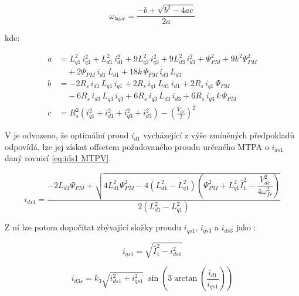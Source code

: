 \begin{equation}
    \label{eq:omega base}
    \omega_{base} = \frac{-b + \sqrt{b^2 - 4ac}}{2a}
\end{equation}

kde:

\begin{equation}
    \label{eq:omega base koef}
    \begin{aligned}
    a &= L_{q1}^2\,i_{q1}^2 + L_{d1}^2\,i_{d1}^2 + 9L_{q3}^2\,i_{q3}^2 + 9L_{d3}^2\,i_{d3}^2
        + \Psi_{PM}^2 + 9k^2\Psi_{PM}^2 \\
      &\quad + 2\Psi_{PM}\,i_{d1}\,L_{d1} + 18k\,\Psi_{PM}\,i_{d3}\,L_{d3} \\[4pt]
    b &= -2R_s\,i_{d1}\,L_{q1}\,i_{q1} + 2R_s\,i_{q1}\,L_{d1}\,i_{d1}
        + 2R_s\,i_{q1}\,\Psi_{PM} \\
      &\quad - 6R_s\,i_{d3}\,L_{q3}\,i_{q3} + 6R_s\,i_{q3}\,L_{d3}\,i_{d3}
        + 6R_s\,i_{q3}\,k\,\Psi_{PM} \\[4pt]
    c &= R_s^2\!\left(i_{q1}^2 + i_{d1}^2 + i_{q3}^2 + i_{d3}^2\right)
        - \left(\frac{V_{dc}}{2}\right)^{\!2}
    \end{aligned}
\end{equation}


V \cite{fieldVeak} je odvozeno, že optimální proud $i_{d1}$ vycházející z výše zmíněných předpokladů odpovídá, lze jej získat offsetem požadovaného proudu určeného MTPA o $i_{ds1}$ daný rovnicí \ref{eq:ids1 MTPV}.

\begin{equation}
    \label{eq:ids1 MTPV}
    i_{ds1} = \frac{-2L_{d1}\Psi_{PM} + \sqrt{4L_{d1}^2\Psi_{PM}^2 - 4\!\left(L_{d1}^2 - L_{q1}^2\right)\!\left(\Psi_{PM}^2 + L_{q1}^2\hat{I}_1^2 - \dfrac{V_{dc}^2}{4\omega_{fr}^2}\right)}}{2\!\left(L_{d1}^2 - L_{q1}^2\right)}
\end{equation}

Z ní lze potom dopočítat zbývající složky proudu $i_{qs1}$, $i_{qs3}$ a $i_{ds3}$ jako :

\begin{equation}
    \label{eq:iqs1 MTPV}
    i_{qs1} = \sqrt{\hat{I}_1^2 - i_{ds1}^2}
\end{equation}

\begin{equation}
    \label{eq:ids3 MTPV}
    i_{d3s} = k_3\sqrt{i_{ds1}^2 + i_{qs1}^2}\;\sin\!\left(3\arctan\!\left(\frac{i_{d1}}{i_{qs1}}\right)\right)
\end{equation}

